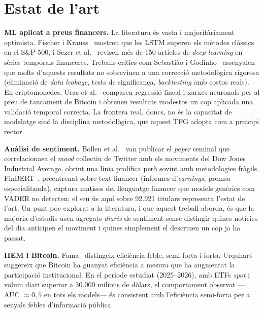 \documentclass[10pt,twocolumn,a4paper]{article}
\begin{document}
\section{Estat de l'art}
\textbf{ML aplicat a preus financers.} La literatura és vasta i majoritàriament
optimista. Fischer i Krauss~\cite{fischer2018} mostren que les LSTM superen els
mètodes clàssics en el S\&P 500, i Sezer et al.~\cite{sezer2020} revisen més de
150 articles de \textit{deep learning} en sèries temporals financeres. Treballs
crítics com Sebastião i Godinho~\cite{sebastiao2021} assenyalen que molts
d'aquests resultats no sobreviuen a una correcció metodològica rigorosa
(eliminació de \textit{data leakage}, tests de significança, \textit{backtesting}
amb costos reals). En criptomonedes, Uras et al.~\cite{uras2020} comparen regressió
lineal i xarxes neuronals per al preu de tancament de Bitcoin i obtenen resultats
modestos un cop aplicada una validació temporal correcta. La frontera real, doncs,
no és la capacitat de modelatge sinó la disciplina metodològica, que aquest TFG
adopta com a principi rector.

\textbf{Anàlisi de sentiment.} Bollen et al.~\cite{bollen2011} van publicar el
\textit{paper} seminal que correlacionava el \textit{mood} col\textperiodcentered{}lectiu
de Twitter amb els moviments del Dow Jones Industrial Average, obrint una línia
prolífica però sovint amb metodologies fràgils. FinBERT~\cite{liu2020}, preentrenat
sobre text financer (informes d'\textit{earnings}, premsa especialitzada), captura
matisos del llenguatge financer que models genèrics com VADER no detecten; el seu
ús aquí sobre 92.921 titulars representa l'estat de l'art. Un punt poc explorat a la
literatura, i que aquest treball aborda, és que la majoria d'estudis usen agregats
\emph{diaris} de sentiment sense distingir quines notícies del dia anticipen el
moviment i quines simplement el descriuen un cop ja ha passat.

\textbf{HEM i Bitcoin.} Fama~\cite{fama1970} distingeix eficiència feble,
semi-forta i forta. Urquhart~\cite{urquhart2016} suggereix que Bitcoin ha guanyat
eficiència a mesura que ha augmentat la participació institucional. En el període
estudiat (2025--2026), amb ETFs \textit{spot} i volum diari superior a 30.000
milions de dòlars, el comportament observat ---AUC $\approx 0{,}5$ en tots els
models--- és consistent amb l'eficiència semi-forta per a senyals febles d'informació
pública.
\end{document}
